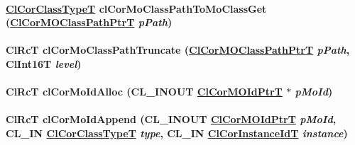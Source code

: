 \hypertarget{group__group13_ga102}{
\paragraph[clCorMoClassPathToMoClassGet]{\setlength{\rightskip}{0pt plus 5cm}\hyperlink{group__group13_ga2}{Cl\-Cor\-Class\-Type\-T} cl\-Cor\-Mo\-Class\-Path\-To\-Mo\-Class\-Get (\hyperlink{struct_cl_cor_m_o_class_path}{Cl\-Cor\-MOClass\-Path\-Ptr\-T} {\em p\-Path})}\hfill}
\label{group__group13_ga102}


\hypertarget{group__group13_ga98}{
\paragraph[clCorMoClassPathTruncate]{\setlength{\rightskip}{0pt plus 5cm}Cl\-Rc\-T cl\-Cor\-Mo\-Class\-Path\-Truncate (\hyperlink{struct_cl_cor_m_o_class_path}{Cl\-Cor\-MOClass\-Path\-Ptr\-T} {\em p\-Path}, Cl\-Int16T {\em level})}\hfill}
\label{group__group13_ga98}


\hypertarget{group__group13_ga108}{
\paragraph[clCorMoIdAlloc]{\setlength{\rightskip}{0pt plus 5cm}Cl\-Rc\-T cl\-Cor\-Mo\-Id\-Alloc (CL\_\-INOUT \hyperlink{struct_cl_cor_m_o_id}{Cl\-Cor\-MOId\-Ptr\-T} $\ast$ {\em p\-Mo\-Id})}\hfill}
\label{group__group13_ga108}


\hypertarget{group__group13_ga112}{
\paragraph[clCorMoIdAppend]{\setlength{\rightskip}{0pt plus 5cm}Cl\-Rc\-T cl\-Cor\-Mo\-Id\-Append (CL\_\-INOUT \hyperlink{struct_cl_cor_m_o_id}{Cl\-Cor\-MOId\-Ptr\-T} {\em p\-Mo\-Id}, CL\_\-IN \hyperlink{group__group13_ga2}{Cl\-Cor\-Class\-Type\-T} {\em type}, CL\_\-IN \hyperlink{group__group13_ga4}{Cl\-Cor\-Instance\-Id\-T} {\em instance})}\hfill}
\label{group__group13_ga112}



